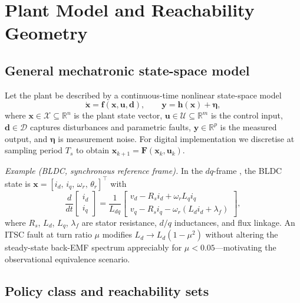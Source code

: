 \documentclass[10pt,twocolumn]{article}
\theoremstyle{plain}
\theoremstyle{definition}
\theoremstyle{remark}
\newcommand{\calX}{\mathcal{X}}
\newcommand{\R}{\mathbb{R}}
\begin{document}
\section{Plant Model and Reachability Geometry}

\subsection{General mechatronic state-space model}

Let the plant be described by a continuous-time nonlinear state-space model
\begin{equation}
  \dot{\bm{x}} = \bm{f}(\bm{x}, \bm{u}, \bm{d}),
  \qquad
  \bm{y} = \bm{h}(\bm{x}) + \bm{\eta},
  \label{eq:plant}
\end{equation}
where $\bm{x} \in \calX \subseteq \R^n$ is the plant state vector,
$\bm{u} \in \mathcal{U} \subseteq \R^m$ is the control input,
$\bm{d} \in \mathcal{D}$ captures disturbances and parametric faults,
$\bm{y} \in \R^p$ is the measured output, and $\bm{\eta}$ is measurement
noise. For digital implementation we discretise at sampling period $T_s$ to
obtain $\bm{x}_{k+1} = \bm{F}(\bm{x}_k, \bm{u}_k)$.

\textit{Example (BLDC, synchronous reference frame).} In the $dq$-frame
\citep{boldea2010electric}, the BLDC state is
$\bm{x} = [i_d,\, i_q,\, \omega_r,\, \theta_r]^\top$ with
\begin{equation}
  \frac{d}{dt}\begin{bmatrix}i_d\\i_q\end{bmatrix}
  = \frac{1}{L_{dq}}\begin{bmatrix}v_d - R_s i_d + \omega_r L_q i_q\\
    v_q - R_s i_q - \omega_r(L_d i_d + \lambda_f)\end{bmatrix},
  \label{eq:dq}
\end{equation}
where $R_s$, $L_d$, $L_q$, $\lambda_f$ are stator resistance, $d/q$ inductances,
and flux linkage. An ITSC fault at turn ratio $\mu$ modifies $L_d \to L_d(1-\mu^2)$
without altering the steady-state back-EMF spectrum appreciably for
$\mu < 0.05$---motivating the observational equivalence scenario.

\subsection{Policy class and reachability sets}
\end{document}
